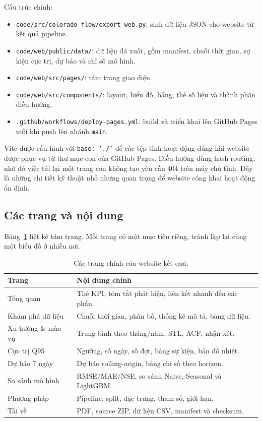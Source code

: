 Cấu trúc chính:

\begin{itemize}[leftmargin=1.4em]
  \item \texttt{code/src/colorado\_flow/export\_web.py}: sinh dữ liệu JSON cho
  website từ kết quả pipeline.
  \item \texttt{code/web/public/data/}: dữ liệu đã xuất, gồm manifest, chuỗi thời
  gian, sự kiện cực trị, dự báo và chỉ số mô hình.
  \item \texttt{code/web/src/pages/}: tám trang giao diện.
  \item \texttt{code/web/src/components/}: layout, biểu đồ, bảng, thẻ số liệu và
  thành phần điều hướng.
  \item \texttt{.github/workflows/deploy-pages.yml}: build và triển khai lên GitHub
  Pages mỗi khi push lên nhánh \texttt{main}.
\end{itemize}

Vite được cấu hình với \texttt{base: './'} để các tệp tĩnh hoạt động đúng khi website
được phục vụ từ thư mục con của GitHub Pages. Điều hướng dùng hash routing, nhờ đó
việc tải lại một trang con không tạo yêu cầu 404 trên máy chủ tĩnh. Đây là những
chi tiết kỹ thuật nhỏ nhưng quan trọng để website công khai hoạt động ổn định.

\subsection{Các trang và nội dung}

Bảng~\ref{tab:website-pages} liệt kê tám trang. Mỗi trang có một mục tiêu riêng,
tránh lặp lại cùng một biểu đồ ở nhiều nơi.

\begin{table}[H]
\centering
\small
\begin{tabularx}{\linewidth}{@{}lX@{}}
\toprule
\textbf{Trang} & \textbf{Nội dung chính} \\
\midrule
Tổng quan & Thẻ KPI, tóm tắt phát hiện, liên kết nhanh đến các phần. \\
Khám phá dữ liệu & Chuỗi thời gian, phân bố, thống kê mô tả, bảng dữ liệu. \\
Xu hướng \& mùa vụ & Trung bình theo tháng/năm, STL, ACF, nhận xét. \\
Cực trị Q95 & Ngưỡng, số ngày, số đợt, bảng sự kiện, bản đồ nhiệt. \\
Dự báo 7 ngày & Dự báo rolling-origin, bảng chỉ số theo horizon. \\
So sánh mô hình & RMSE/MAE/NSE, so sánh Naive, Seasonal và LightGBM. \\
Phương pháp & Pipeline, split, đặc trưng, tham số, giới hạn. \\
Tải về & PDF, source ZIP, dữ liệu CSV, manifest và checksum. \\
\bottomrule
\end{tabularx}
\caption{Các trang chính của website kết quả.}
\label{tab:website-pages}
\end{table}

